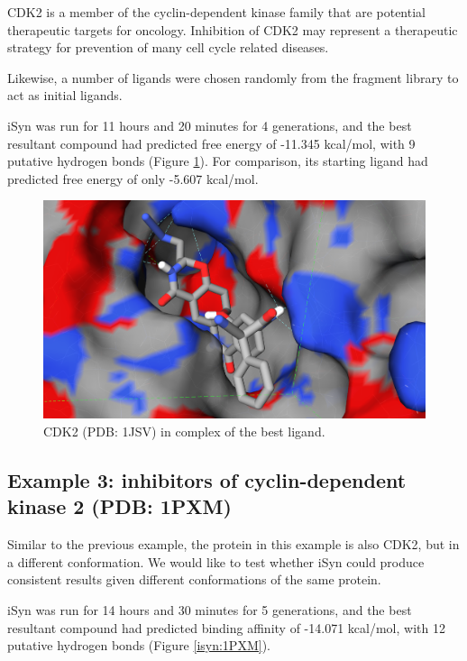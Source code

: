 CDK2 is a member of the cyclin-dependent kinase family that are potential therapeutic targets for oncology. Inhibition of CDK2 may represent a therapeutic strategy for prevention of many cell cycle related diseases.

Likewise, a number of ligands were chosen randomly from the fragment library to act as initial ligands.

iSyn was run for 11 hours and 20 minutes for 4 generations, and the best resultant compound had predicted free energy of -11.345 kcal/mol, with 9 putative hydrogen bonds (Figure \ref{isyn:1JSV}). For comparison, its starting ligand had predicted free energy of only -5.607 kcal/mol.

\begin{figure}
\begin{center}
\includegraphics[width=\linewidth]{../isyn/1JSV.png}
\end{center}
\caption{CDK2 (PDB: 1JSV) in complex of the best ligand.}
\label{isyn:1JSV}
\end{figure}

\subsection{Example 3: inhibitors of cyclin-dependent kinase 2 (PDB: 1PXM)}

Similar to the previous example, the protein in this example is also CDK2, but in a different conformation. We would like to test whether iSyn could produce consistent results given different conformations of the same protein.

iSyn was run for 14 hours and 30 minutes for 5 generations, and the best resultant compound had predicted binding affinity of -14.071 kcal/mol, with 12 putative hydrogen bonds (Figure \ref{isyn:1PXM}).
 
